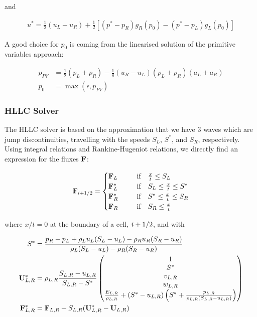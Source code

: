 and

\begin{align*}
	u^*  = \frac{1}{2} (u_L + u_R) + \frac{1}{2} \left[ (p^* - p_R) g_R(p_0) - (p^* - p_L) g_L(p_0) \right]
\end{align*}


A good choice for $p_0$ is coming from the linearised solution of the primitive variables approach:

\begin{align*}
	p_{PV} &= \frac{1}{2} (p_L + p_R) - \frac{1}{8} (u_R - u_L)(\rho_L + \rho_R)(a_L + a_R)\\
	p_0 &= \max(\epsilon, p_{PV})
\end{align*}










\subsubsection{HLLC Solver}


The HLLC solver is based on the approximation that we have 3 waves which are jump discontinuities, travelling with the speeds $S_L$, $S^*$, and $S_R$, respectively.
Using integral relations and Rankine-Hugeniot relations, we directly find an expression for the fluxes $\mathbf{F}$:


\begin{align}
	\mathbf{F}_{i+1/2} = \begin{cases}
		\mathbf{F}_L ~~~~ &\text{ if }		~~	\frac{x}{t} \leq S_L \\
		\mathbf{F}^*_L ~~~~ &\text{ if }	~~  S_L \leq \frac{x}{t} \leq S^* \\
		\mathbf{F}^*_R ~~~~ &\text{ if }	~~	S^* \leq \frac{x}{t} \leq S_R \\
		\mathbf{F}_R ~~~~ &\text{ if }		~~	S_R \leq \frac{x}{t} \\
	\end{cases}
\end{align}

where $x/t = 0$ at the boundary of a cell, $i+1/2$, and with

\begin{align*}
	S^* &=
		\frac{p_R - p_L  + \rho_L u_L (S_L - u_L) - \rho_R u_R (S_R - u_R)}
			{\rho_L (S_L - u_L) - \rho_R (S_R - u_R) }\\
	\mathbf{U}^*_{L,R} &=
		\rho_{L,R} \frac{ S_{L,R} - u_{L,R}}{S_{L,R} - S^*} 
		\begin{pmatrix}
			1\\
			S^*\\
			v_{L,R}\\
			w_{L,R}\\
			\frac{E_{L,R}}{\rho_{L,R}} + (S^* - u_{L,R}) \left( S^* + \frac{p_{L,R}}{\rho_{L,R}(S_{L,R} - u_{L,R})} \right)
		\end{pmatrix} \\
	\mathbf{F}^*_{L,R} &=
		\mathbf{F}_{L, R} + S_{L,R} ( \mathbf{U}^*_{L,R} - \mathbf{U}_{L,R} )
\end{align*}


